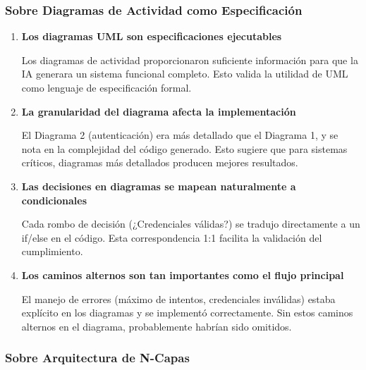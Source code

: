 \documentclass[11pt,a4paper]{article}
\begin{document}
\subsubsection{Sobre Diagramas de Actividad como Especificación}

\begin{enumerate}
    \item \textbf{Los diagramas UML son especificaciones ejecutables}
    
    Los diagramas de actividad proporcionaron suficiente información para que la IA generara un sistema funcional completo. Esto valida la utilidad de UML como lenguaje de especificación formal.
    
    \item \textbf{La granularidad del diagrama afecta la implementación}
    
    El Diagrama 2 (autenticación) era más detallado que el Diagrama 1, y se nota en la complejidad del código generado. Esto sugiere que para sistemas críticos, diagramas más detallados producen mejores resultados.
    
    \item \textbf{Las decisiones en diagramas se mapean naturalmente a condicionales}
    
    Cada rombo de decisión (¿Credenciales válidas?) se tradujo directamente a un if/else en el código. Esta correspondencia 1:1 facilita la validación del cumplimiento.
    
    \item \textbf{Los caminos alternos son tan importantes como el flujo principal}
    
    El manejo de errores (máximo de intentos, credenciales inválidas) estaba explícito en los diagramas y se implementó correctamente. Sin estos caminos alternos en el diagrama, probablemente habrían sido omitidos.
\end{enumerate}

\subsubsection{Sobre Arquitectura de N-Capas}
\end{document}
